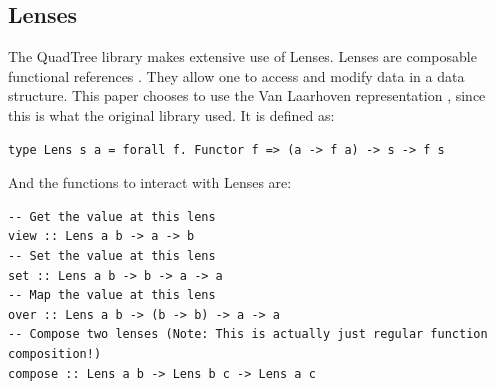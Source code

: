 \subsection{Lenses}
The QuadTree library makes extensive use of Lenses. Lenses are composable functional references \cite{lens}. They allow one to access and modify data in a data structure. This paper chooses to use the Van Laarhoven representation \cite{laarhovenlens}, since this is what the original library used. It is defined as:
\begin{verbatim}
type Lens s a = forall f. Functor f => (a -> f a) -> s -> f s
\end{verbatim}
And the functions to interact with Lenses are:
\begin{verbatim}
-- Get the value at this lens
view :: Lens a b -> a -> b
-- Set the value at this lens
set :: Lens a b -> b -> a -> a
-- Map the value at this lens
over :: Lens a b -> (b -> b) -> a -> a
-- Compose two lenses (Note: This is actually just regular function composition!)
compose :: Lens a b -> Lens b c -> Lens a c
\end{verbatim}